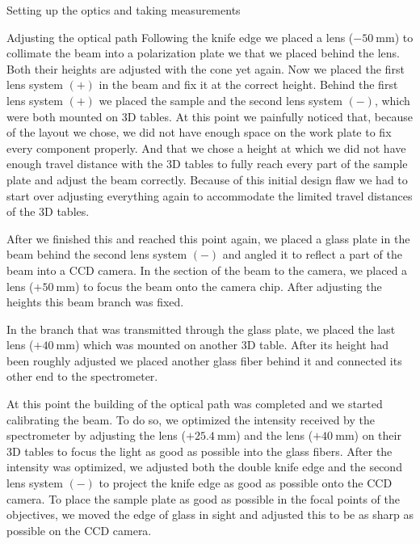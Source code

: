 \documentclass[pdftex, a4paper,11pt, twoside, UKenglish]{report}
\begin{document}
\begin{chapter}{Setting up the optics and taking measurements}
\begin{section}{Adjusting the optical path}
      Following the knife edge we placed a lens ($\SI{-50}{\milli\meter}$) to
      collimate the beam into a polarization plate we that we placed behind the
      lens. Both their heights are adjusted with the cone yet again.
      Now we placed the first lens system $(+)$ in the beam and fix it at the
      correct height. 
      Behind the first lens system $(+)$ we placed the sample and the second
      lens system $(-)$, which were both mounted on 3D tables.
      At this point we painfully noticed that, because of the layout we chose,
      we did not have enough space on the work plate to fix every component
      properly. And that we chose a height at which we did not have enough
      travel distance with the 3D tables to fully reach every part of the sample
      plate and adjust the beam correctly.
      Because of this initial design flaw we had to
      start over adjusting everything again to accommodate the limited
      travel distances of the 3D tables. 
      
      After we finished this and reached this point again, we placed a glass
      plate in the beam behind the second lens system $(-)$ and angled it to
      reflect a part of the beam into a CCD camera. In the section of the beam
      to the camera, we placed a lens ($+\SI{50}{\milli\meter}$) to focus the
      beam onto the camera chip. After adjusting the heights this beam branch
      was fixed.
      
      In the branch that was transmitted through the glass plate, we
      placed the last lens ($+\SI{40}{\milli\meter}$) which was mounted on
      another 3D table. After its height had been roughly adjusted we placed
      another glass fiber behind it and connected its other end to the
      spectrometer.
      
      At this point the building of the optical path was completed
      and we started calibrating the beam. To do so, we optimized the intensity
      received by the spectrometer by adjusting the
      lens ($+\SI{25.4}{\milli\meter}$) and the lens ($+\SI{40}{\milli\meter}$)
      on their 3D tables to focus the light as good as possible into the glass
      fibers. After the intensity was optimized, we adjusted both the
      double knife edge and the second lens system $(-)$ to project the knife edge
      as good as possible onto the CCD camera. To place the sample plate as good
      as possible in the focal points of the objectives, we moved the edge of
      glass in sight and adjusted this to be as sharp as possible on the CCD
      camera. 
      

\end{section}
\end{chapter}
\end{document}
